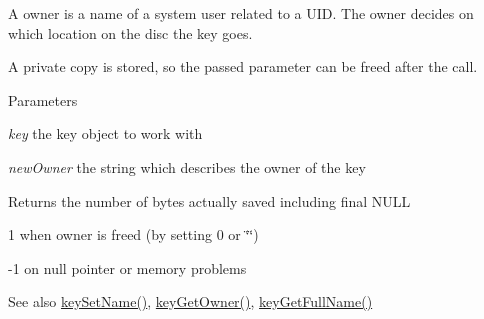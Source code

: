 A owner is a name of a system user related to a UID. The owner decides on which location on the disc the key goes.

A private copy is stored, so the passed parameter can be freed after the call.


\begin{DoxyParams}{Parameters}
\item[{\em key}]the key object to work with \item[{\em newOwner}]the string which describes the owner of the key \end{DoxyParams}
\begin{DoxyReturn}{Returns}
the number of bytes actually saved including final NULL 

1 when owner is freed (by setting 0 or \char`\"{}\char`\"{}) 

-\/1 on null pointer or memory problems 
\end{DoxyReturn}
\begin{DoxySeeAlso}{See also}
\hyperlink{group__keyname_ga7699091610e7f3f43d2949514a4b35d9}{keySetName()}, \hyperlink{group__keyname_ga35922a017bee8b4bcb493bbdfad9d6f5}{keyGetOwner()}, \hyperlink{group__keyname_gaaba1494a5ffc976e0e56c43f4334a23c}{keyGetFullName()} 
\end{DoxySeeAlso}
